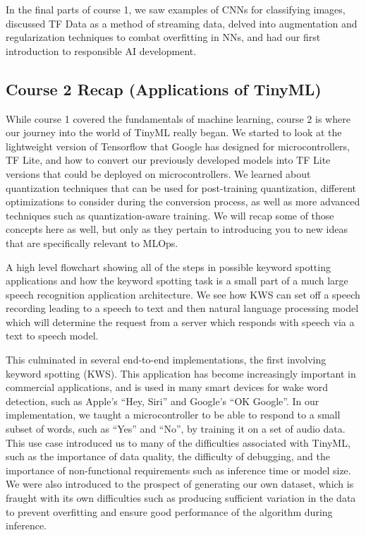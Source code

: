 In the final parts of course 1, we saw examples of CNNs for classifying images, discussed TF Data as a method of streaming data, delved into augmentation and regularization techniques to combat overfitting in NNs, and had our first introduction to responsible AI development.

\subsection{Course 2 Recap (Applications of TinyML)}

While course 1 covered the fundamentals of machine learning, course 2 is where our journey into the world of TinyML really began. We started to look at the lightweight version of Tensorflow that Google has designed for microcontrollers, TF Lite, and how to convert our previously developed models into TF Lite versions that could be deployed on microcontrollers. We learned about quantization techniques that can be used for post-training quantization, different optimizations to consider during the conversion process, as well as more advanced techniques such as quantization-aware training. We will recap some of those concepts here as well, but only as they pertain to introducing you to new ideas that are specifically relevant to MLOps.



A high level flowchart showing all of the steps in possible keyword spotting applications and how the keyword spotting task is a small part of a much large speech recognition application architecture. We see how KWS can set off a speech recording leading to a speech to text and then natural language processing model which will determine the request from a server which responds with speech via a text to speech model.

This culminated in several end-to-end implementations, the first involving keyword spotting (KWS). This application has become increasingly important in commercial applications, and is used in many smart devices for wake word detection, such as Apple’s “Hey, Siri” and Google’s “OK Google”. In our implementation, we taught a microcontroller to be able to respond to a small subset of words, such as “Yes” and “No”, by training it on a set of audio data. This use case introduced us to many of the difficulties associated with TinyML, such as the importance of data quality, the difficulty of debugging, and the importance of non-functional requirements such as inference time or model size. We were also introduced to the prospect of generating our own dataset, which is fraught with its own difficulties such as producing sufficient variation in the data to prevent overfitting and ensure good performance of the algorithm during inference.

